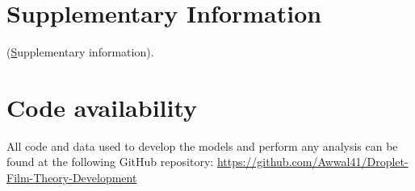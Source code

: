 \documentclass[journal=jacsat,manuscript=article]{achemso}
\theoremstyle{thmstyleone}%
\theoremstyle{thmstyletwo}%
\theoremstyle{thmstylethree}%
\begin{document}
\section{Supplementary Information}
(\href{SI.pdf}Supplementary information).
\section{Code availability}
All code and data used to develop the models and perform any analysis can be found at the following GitHub repository: \href{https://github.com/Awwal41/symbolic-machine-learning-liquidloading}{https://github.com/Awwal41/Droplet-Film-Theory-Development}


\newpage
\end{document}
